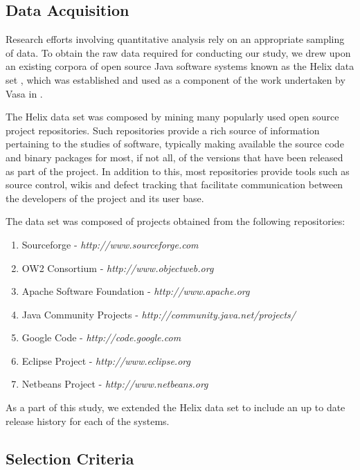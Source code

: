 
\subsection{Data Acquisition} %
\label{sub:data_acquisition}

Research efforts involving quantitative analysis rely on an appropriate sampling of data. To obtain the raw data required for conducting our study, we drew upon an existing corpora of open source Java software systems known as the Helix data set \cite{Helix10a}, which was established and used as a component of the work undertaken by Vasa in \cite{Vasa10a}.

The Helix data set was composed by mining many popularly used open source project repositories. Such repositories provide a rich source of information pertaining to the studies of software, typically making available the source code and binary packages for most, if not all, of the versions that have been released as part of the project. In addition to this, most repositories provide tools such as source control, wikis and defect tracking that facilitate communication between the developers of the project and its user base.

\bigskip
The data set was composed of projects obtained from the following repositories:
\begin{enumerate}
	\item Sourceforge - {\em http://www.sourceforge.com}
	\item OW2 Consortium - {\em http://www.objectweb.org}
	\item Apache Software Foundation - {\em http://www.apache.org}
	\item Java Community Projects - {\em http://community.java.net/projects/}
	\item Google Code - {\em http://code.google.com}
	\item Eclipse Project - {\em http://www.eclipse.org}
	\item Netbeans Project - {\em http://www.netbeans.org}
\end{enumerate}

As a part of this study, we extended the Helix data set to include an up to date release history for each of the systems.


\subsection{Selection Criteria} %
\label{sub:selection_criteria}

